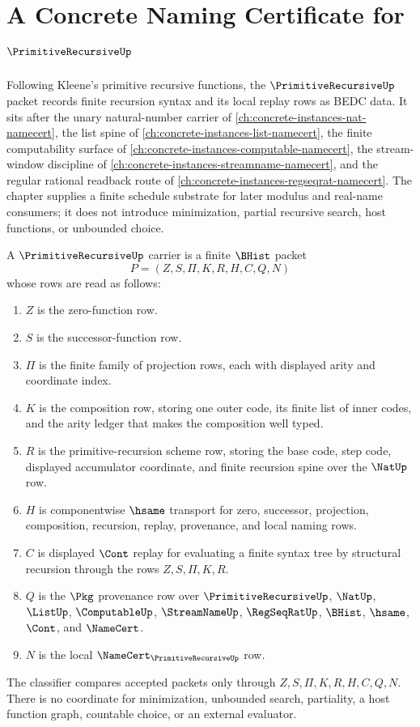 \chapter{A Concrete Naming Certificate for $\PrimitiveRecursiveUp$}
\label{ch:concrete-instances-primitive-recursive-namecert}

Following Kleene's primitive recursive functions, the $\PrimitiveRecursiveUp$ packet records finite recursion syntax and its local replay rows as BEDC data. It sits after the unary natural-number carrier of \autoref{ch:concrete-instances-nat-namecert}, the list spine of \autoref{ch:concrete-instances-list-namecert}, the finite computability surface of \autoref{ch:concrete-instances-computable-namecert}, the stream-window discipline of \autoref{ch:concrete-instances-streamname-namecert}, and the regular rational readback route of \autoref{ch:concrete-instances-regseqrat-namecert}. The chapter supplies a finite schedule substrate for later modulus and real-name consumers; it does not introduce minimization, partial recursive search, host functions, or unbounded choice.

\begin{definition}
\label{def:primitive-recursive-carrier}
A $\PrimitiveRecursiveUp$ carrier is a finite $\BHist$ packet
$$
P=(Z,S,\Pi,K,R,H,C,Q,N)
$$
whose rows are read as follows:
\begin{enumerate}
\item $Z$ is the zero-function row.
\item $S$ is the successor-function row.
\item $\Pi$ is the finite family of projection rows, each with displayed arity and coordinate index.
\item $K$ is the composition row, storing one outer code, its finite list of inner codes, and the arity ledger that makes the composition well typed.
\item $R$ is the primitive-recursion scheme row, storing the base code, step code, displayed accumulator coordinate, and finite recursion spine over the $\NatUp$ row.
\item $H$ is componentwise $\hsame$ transport for zero, successor, projection, composition, recursion, replay, provenance, and local naming rows.
\item $C$ is displayed $\Cont$ replay for evaluating a finite syntax tree by structural recursion through the rows $Z,S,\Pi,K,R$.
\item $Q$ is the $\Pkg$ provenance row over $\PrimitiveRecursiveUp$, $\NatUp$, $\ListUp$, $\ComputableUp$, $\StreamNameUp$, $\RegSeqRatUp$, $\BHist$, $\hsame$, $\Cont$, and $\NameCert$.
\item $N$ is the local $\NameCert_{\PrimitiveRecursiveUp}$ row.
\end{enumerate}
The classifier compares accepted packets only through $Z,S,\Pi,K,R,H,C,Q,N$. There is no coordinate for minimization, unbounded search, partiality, a host function graph, countable choice, or an external evaluator.
\end{definition}

